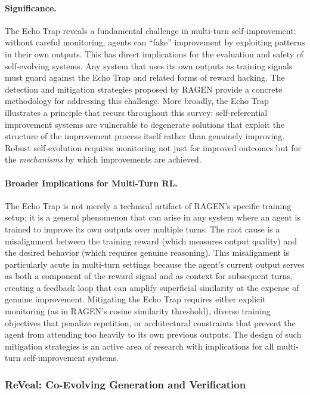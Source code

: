 \paragraph{Significance.}
The Echo Trap reveals a fundamental challenge in multi-turn self-improvement: without careful monitoring, agents can ``fake'' improvement by exploiting patterns in their own outputs. This has direct implications for the evaluation and safety of self-evolving systems. Any system that uses its own outputs as training signals must guard against the Echo Trap and related forms of reward hacking. The detection and mitigation strategies proposed by RAGEN provide a concrete methodology for addressing this challenge. More broadly, the Echo Trap illustrates a principle that recurs throughout this survey: self-referential improvement systems are vulnerable to degenerate solutions that exploit the structure of the improvement process itself rather than genuinely improving. Robust self-evolution requires monitoring not just for improved outcomes but for the \emph{mechanisms} by which improvements are achieved.

\paragraph{Broader Implications for Multi-Turn RL.}
The Echo Trap is not merely a technical artifact of RAGEN's specific training setup; it is a general phenomenon that can arise in any system where an agent is trained to improve its own outputs over multiple turns. The root cause is a misalignment between the training reward (which measures output quality) and the desired behavior (which requires genuine reasoning). This misalignment is particularly acute in multi-turn settings because the agent's current output serves as both a component of the reward signal and as context for subsequent turns, creating a feedback loop that can amplify superficial similarity at the expense of genuine improvement. Mitigating the Echo Trap requires either explicit monitoring (as in RAGEN's cosine similarity threshold), diverse training objectives that penalize repetition, or architectural constraints that prevent the agent from attending too heavily to its own previous outputs. The design of such mitigation strategies is an active area of research with implications for all multi-turn self-improvement systems.


\subsubsection{ReVeal: Co-Evolving Generation and Verification}
\label{sec:reveal}


